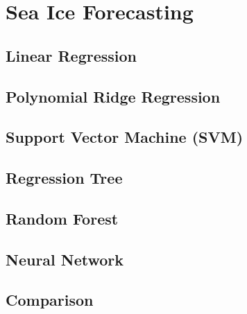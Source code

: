 \section{Sea Ice Forecasting} %

\subsection{Linear Regression} %

\subsection{Polynomial Ridge Regression} %

\subsection{Support Vector Machine (SVM)} %

\subsection{Regression Tree} %

\subsection{Random Forest} %

\subsection{Neural Network} %

\subsection{Comparison} %

